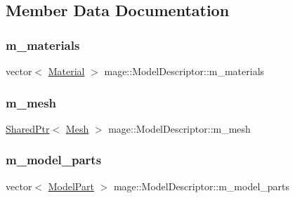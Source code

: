 \subsection{Member Data Documentation}
\hypertarget{classmage_1_1_model_descriptor_a672238b257f99836243d84f634ffeea2}{}\label{classmage_1_1_model_descriptor_a672238b257f99836243d84f634ffeea2} 
\subsubsection{\texorpdfstring{m\+\_\+materials}{m\_materials}}
{\footnotesize\ttfamily vector$<$ \hyperlink{structmage_1_1_material}{Material} $>$ mage\+::\+Model\+Descriptor\+::m\+\_\+materials\hspace{0.3cm}{\ttfamily [private]}}

\hypertarget{classmage_1_1_model_descriptor_a89ac31356e7690007c618be387399151}{}\label{classmage_1_1_model_descriptor_a89ac31356e7690007c618be387399151} 
\subsubsection{\texorpdfstring{m\+\_\+mesh}{m\_mesh}}
{\footnotesize\ttfamily \hyperlink{namespacemage_a1e01ae66713838a7a67d30e44c67703e}{Shared\+Ptr}$<$ \hyperlink{classmage_1_1_mesh}{Mesh} $>$ mage\+::\+Model\+Descriptor\+::m\+\_\+mesh\hspace{0.3cm}{\ttfamily [private]}}

\hypertarget{classmage_1_1_model_descriptor_a200c6e44c9b6a5bde5c8490fb93ba00f}{}\label{classmage_1_1_model_descriptor_a200c6e44c9b6a5bde5c8490fb93ba00f} 
\subsubsection{\texorpdfstring{m\+\_\+model\+\_\+parts}{m\_model\_parts}}
{\footnotesize\ttfamily vector$<$ \hyperlink{structmage_1_1_model_part}{Model\+Part} $>$ mage\+::\+Model\+Descriptor\+::m\+\_\+model\+\_\+parts\hspace{0.3cm}{\ttfamily [private]}}

